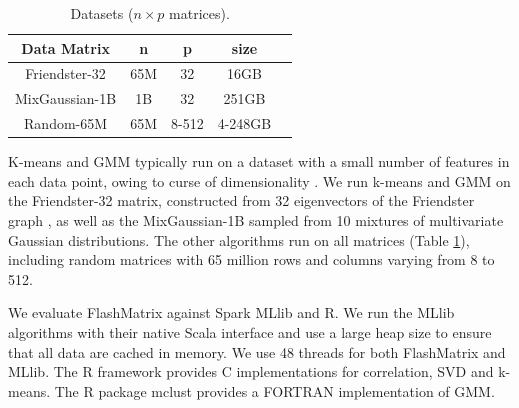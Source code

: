\begin{table}
\begin{center}
\footnotesize
\begin{tabular}{|c|c|c|c|c|}
\hline
Data Matrix & n & p & size \\
\hline
Friendster-32 \cite{friendster} & 65M & 32 & 16GB \\
\hline
MixGaussian-1B & 1B & 32 & 251GB \\
\hline
Random-65M & 65M & 8-512 & 4-248GB \\
\hline
\end{tabular}
\normalsize
\end{center}
\vspace{-10pt}
\caption{Datasets ($n \times p$ matrices).}
\label{tbl:data}
\vspace{-10pt}
\end{table}

K-means and GMM typically run on a dataset with a small number of features
in each data point, owing to curse of dimensionality \cite{Jain00}.
We run k-means and GMM on
the Friendster-32 matrix, constructed from 32 eigenvectors of the Friendster
graph \cite{friendster}, as well as the MixGaussian-1B
sampled from 10 mixtures of multivariate Gaussian distributions.
The other algorithms run on all matrices (Table \ref{tbl:data}),
including random matrices with 65 million rows and columns
varying from 8 to 512.

%


We evaluate FlashMatrix against
Spark MLlib \cite{mllib} and R. We run the MLlib algorithms
with their native Scala interface and use a large heap size to ensure that
all data are cached in memory. We use 48 threads for both FlashMatrix and
MLlib. %
The R framework provides C implementations for correlation, SVD and k-means.
The R package mclust \cite{mclust} provides a FORTRAN implementation of GMM.

